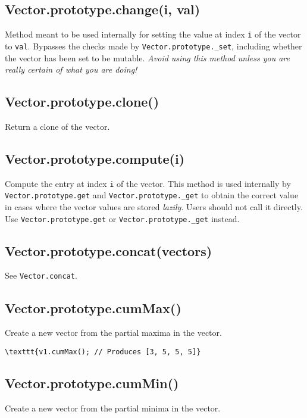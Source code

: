 \documentclass{article}
\begin{document}
    \subsection*{Vector.prototype.change(i, val)}
    Method meant to be used internally for setting the value at index \texttt{i} of the
vector to \texttt{val}. Bypasses the checks made by \texttt{Vector.prototype.\_set}, including
whether the vector has been set to be mutable. \emph{Avoid using this method unless
you are really certain of what you are doing!}


    \subsection*{Vector.prototype.clone()}
    Return a clone of the vector.


    \subsection*{Vector.prototype.compute(i)}
    Compute the entry at index \texttt{i} of the vector. This method is used internally
by \texttt{Vector.prototype.get} and \texttt{Vector.prototype.\_get} to obtain the correct
value in cases where the vector values are stored \emph{lazily}. Users should not
call it directly. Use \texttt{Vector.prototype.get} or \texttt{Vector.prototype.\_get} instead.


    \subsection*{Vector.prototype.concat(vectors)}
    See \texttt{Vector.concat}.


    \subsection*{Vector.prototype.cumMax()}
    Create a new vector from the partial maxima in the vector.


\begin{lstlisting}
\texttt{v1.cumMax(); // Produces [3, 5, 5, 5]}\end{lstlisting}

    \subsection*{Vector.prototype.cumMin()}
    Create a new vector from the partial minima in the vector.
\end{document}
